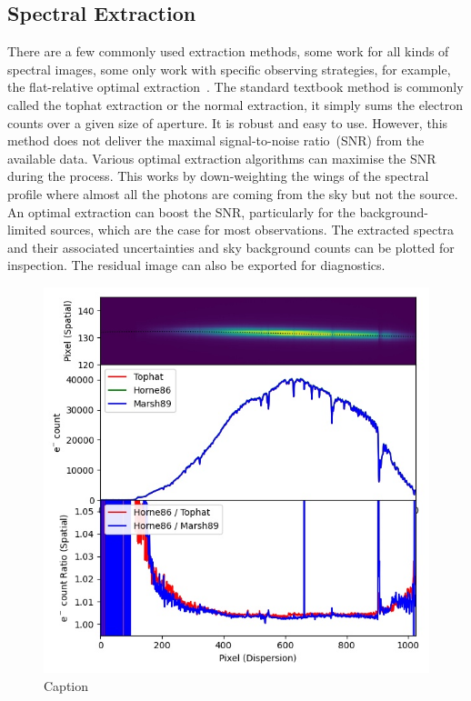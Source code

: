 \documentclass[fleqn,usenatbib]{mnras}
\begin{document}
\subsection{Spectral Extraction}
\label{sec:extract}
There are a few commonly used extraction methods, some work for
all kinds of spectral images, some only work with specific
observing strategies, for example, the flat-relative optimal
extraction~\citep{2014A&A...561A..59Z}. The standard textbook
method is commonly called the tophat extraction or the normal
extraction, it simply sums the electron counts over a given
size of aperture. It is robust and easy to use. However, this
method does not deliver the maximal signal-to-noise ratio~(SNR)
from the available data. Various optimal extraction algorithms
can maximise the SNR during the process. This works by
down-weighting the wings of the spectral profile where almost
all the photons are coming from the sky but not the source. An
optimal extraction can boost the SNR, particularly for the
background-limited sources, which are the case for most
observations. The extracted spectra and their associated
uncertainties and sky background counts can be plotted for
inspection. The residual image can also be exported for
diagnostics.

\begin{figure}
    \centering
    \includegraphics[width=\columnwidth]{fig_03_extraction_compared.jpg}
    \caption{Caption}
    \label{fig:extract}
\end{figure}
\end{document}

